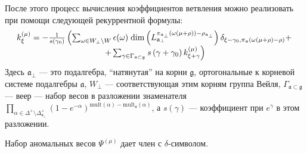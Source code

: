\documentclass[a4paper,12pt]{article}
\theoremstyle{definition} \newtheorem{Def}{Definition}
\begin{document}
После этого процесс вычисления коэффициентов ветвления можно реализовать при помощи следующей
рекуррентной формулы:
\begin{equation}
  \label{eq:1}
  \begin{array}{c}
      k_{\xi }^{\left( \mu \right) }=-\frac{1}{s\left( \gamma _{0}\right) }\left(
  \sum_{\omega\in W_{\bot}\backslash W} \epsilon(\omega)\; {\rm dim}\left(L^{\pi_{\mathfrak{a}_{\bot}}(\omega(\mu+\rho))-\rho_{\mathfrak{a}_{\bot}}}_{\mathfrak{a}_{\bot}}\right) \delta_{\xi-\gamma_0,\pi_{\mathfrak{a}}(\omega(\mu+\rho)-\rho)}+ \right.\\
\left.
+\sum_{\gamma \in
\Gamma _{\frak{a}\subset \frak{g}}}s\left( \gamma +\gamma _{0}\right) k_{\xi
+\gamma }^{\left( \mu \right) }\right)

  \end{array}
\end{equation}
Здесь $\mathfrak{a}_{\bot}$ --- это подалгебра, ``натянутая'' на корни $\mathfrak{g}$, ортогональные
к корневой системе подалгебры  $\mathfrak{a}$, $W_{\bot}$ --- соответствующая этим корням группа Вейля,
$\Gamma_{\mathfrak{a}\subset \mathfrak{g}}$ --- веер --- набор весов в разложении знаменателя $\prod_{\alpha\in \Delta^{+}\setminus \Delta^{+}_{\mathfrak{a}_{\bot}}}
(1-e^{-\alpha})^{\mathrm{mult}(\alpha)-\mathrm{mult}_{\mathfrak{a}}(\alpha)}$, а $s(\gamma)$ ---
коэффициент при  $e^{\gamma}$ в этом разложении.

Набор аномальных весов $\Psi^{(\mu)}$ дает член с $\delta$-символом.
\end{document}
